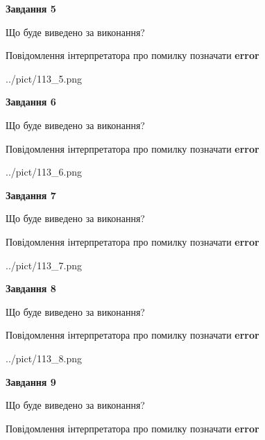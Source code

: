 \documentclass[11pt, ukrainian]{article}
\begin{document}
{\begin {large}
{\begin {center}\textbf{Завдання 5}\end {center}}\par
Що буде виведено за виконання? \par
Повідомлення інтерпретатора про помилку позначати \textbf{error}

\begin{center}
	{../pict/113_5.png}
\end{center}
\newpage

{\begin {center}\textbf{Завдання 6}\end {center}}\par
Що буде виведено за виконання? \par
Повідомлення інтерпретатора про помилку позначати \textbf{error}

\begin{center}
	{../pict/113_6.png}
\end{center}
\newpage

{\begin {center}\textbf{Завдання 7}\end {center}}\par
Що буде виведено за виконання? \par
Повідомлення інтерпретатора про помилку позначати \textbf{error}

\begin{center}
	{../pict/113_7.png}
\end{center}
\newpage

{\begin {center}\textbf{Завдання 8}\end {center}}\par
Що буде виведено за виконання? \par
Повідомлення інтерпретатора про помилку позначати \textbf{error}

\begin{center}
	{../pict/113_8.png}
\end{center}
\newpage

{\begin {center}\textbf{Завдання 9}\end {center}}\par
Що буде виведено за виконання? \par
Повідомлення інтерпретатора про помилку позначати \textbf{error}


\end{large}}
\end{document}
